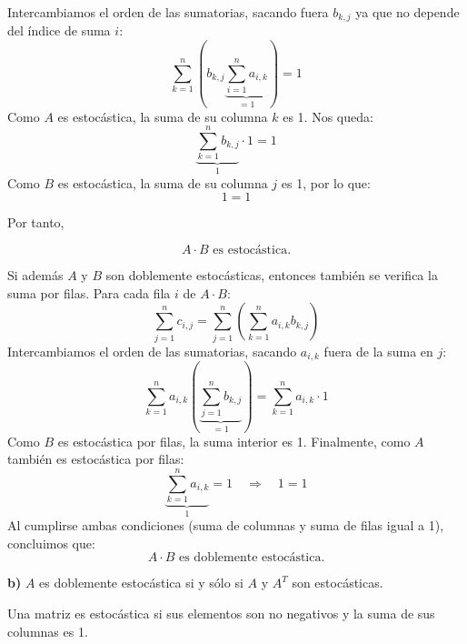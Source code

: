 \documentclass[a4paper,12pt]{article}
\begin{document}
\begin{ejercicio}[title=Ejercicio 43 (⋆)]
\begin{itemize}
Intercambiamos el orden de las sumatorias, sacando fuera $b_{k,j}$ ya que no depende del índice de suma $i$:
\[
\sum_{k=1}^n \left( b_{k,j} \underbrace{\sum_{i=1}^n a_{i,k}}_{=1} \right) = 1
\]
Como $A$ es estocástica, la suma de su columna $k$ es 1. Nos queda:
\[
\underbrace{\sum_{k=1}^n b_{k,j}}_{1} \cdot 1 = 1
\]
Como $B$ es estocástica, la suma de su columna $j$ es 1, por lo que:
\[
1 = 1
\]
\end{itemize}

Por tanto,

\[
\boxed{\text{$A\cdot B$ es estocástica.}}
\]

Si además $A$ y $B$ son doblemente estocásticas, entonces también se verifica la suma por filas. Para cada fila $i$ de $A \cdot B$:
\[
\sum_{j=1}^n c_{i,j} = \sum_{j=1}^n \left( \sum_{k=1}^n a_{i,k} b_{k,j} \right)
\]
Intercambiamos el orden de las sumatorias, sacando $a_{i,k}$ fuera de la suma en $j$:
\[
\sum_{k=1}^n a_{i,k} \left( \underbrace{\sum_{j=1}^n b_{k,j}}_{=1} \right) = \sum_{k=1}^n a_{i,k} \cdot 1
\]
Como $B$ es estocástica por filas, la suma interior es 1. Finalmente, como $A$ también es estocástica por filas:
\[
\underbrace{\sum_{k=1}^n a_{i,k}}_{1} = 1 \quad \Rightarrow \quad 1 = 1
\]
Al cumplirse ambas condiciones (suma de columnas y suma de filas igual a 1), concluimos que:
\[
\boxed{\text{$A \cdot B$ es doblemente estocástica.}}
\]

\textbf{b)} $A$ es doblemente estocástica si y sólo si $A$ y $A^T$ son estocásticas.

\vspace{0.5em}

Una matriz es estocástica si sus elementos son no negativos y la suma de sus columnas es 1.
\end{ejercicio}
\end{document}
